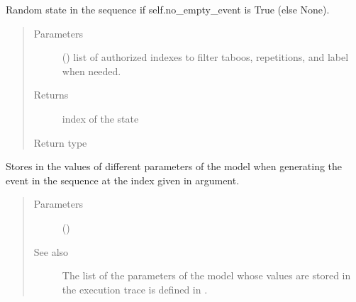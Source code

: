 \documentclass[letterpaper,10pt,english]{sphinxmanual}
\begin{document}
\begin{fulllineitems}
\begin{fulllineitems}
\label{\detokenize{index:Navigator.Navigator.navigate_without_continuation}}
Random state in the sequence if self.no\_empty\_event is True (else None).
\begin{quote}\begin{description}
\item[{Parameters}] \leavevmode
{} (\sphinxstyleliteralemphasis{(}\sphinxstyleliteralemphasis{)}) \textendash{} list of authorized indexes to filter taboos, repetitions, and label when needed.

\item[{Returns}] \leavevmode
index of the state

\item[{Return type}] \leavevmode
{}

\end{description}\end{quote}

\end{fulllineitems}


\begin{fulllineitems}
\label{\detokenize{index:Navigator.Navigator.record_execution_trace}}
Stores in  the values of different parameters of the model when generating the event in the sequence at the index given in argument.
\begin{quote}\begin{description}
\item[{Parameters}] \leavevmode
{} () \textendash{} 

\item[{See also}] \leavevmode
The list of the parameters of the model whose values are stored in the execution trace is defined in .


\end{description}
\end{quote}
\end{fulllineitems}
\end{fulllineitems}
\end{document}
